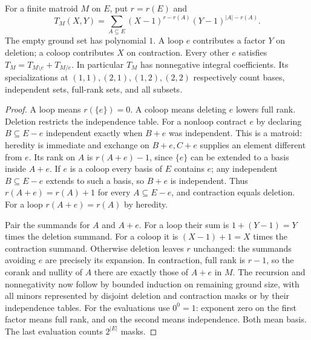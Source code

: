 \begin{theorem}\label{result52}
For a finite matroid $M$ on $E$, put $r=r(E)$ and
\[
 T_M(X,Y)=\sum_{A\subseteq E}(X-1)^{r-r(A)}(Y-1)^{|A|-r(A)}.
\]
The empty ground set has polynomial $1$. A loop $e$ contributes a factor $Y$ on deletion; a coloop contributes $X$ on contraction. Every other $e$ satisfies $T_M=T_{M\setminus e}+T_{M/e}$. In particular $T_M$ has nonnegative integral coefficients. Its specializations at $(1,1),(2,1),(1,2),(2,2)$ respectively count bases, independent sets, full-rank sets, and all subsets.
\end{theorem}
\begin{proof}
A loop means $r(\{e\})=0$. A coloop means deleting $e$ lowers full rank. Deletion restricts the independence table. For a nonloop contract $e$ by declaring $B\subseteq E-e$ independent exactly when $B+e$ was independent. This is a matroid: heredity is immediate and exchange on $B+e,C+e$ supplies an element different from $e$. Its rank on $A$ is $r(A+e)-1$, since $\{e\}$ can be extended to a basis inside $A+e$. If $e$ is a coloop every basis of $E$ contains $e$; any independent $B\subseteq E-e$ extends to such a basis, so $B+e$ is independent. Thus $r(A+e)=r(A)+1$ for every $A\subseteq E-e$, and contraction equals deletion. For a loop $r(A+e)=r(A)$ by heredity.

Pair the summands for $A$ and $A+e$. For a loop their sum is $1+(Y-1)=Y$ times the deletion summand. For a coloop it is $(X-1)+1=X$ times the contraction summand. Otherwise deletion leaves $r$ unchanged: the summands avoiding $e$ are precisely its expansion. In contraction, full rank is $r-1$, so the corank and nullity of $A$ there are exactly those of $A+e$ in $M$. The recursion and nonnegativity now follow by bounded induction on remaining ground size, with all minors represented by disjoint deletion and contraction masks or by their independence tables. For the evaluations use $0^0=1$: exponent zero on the first factor means full rank, and on the second means independence. Both mean basis. The last evaluation counts $2^{|E|}$ masks.
\end{proof}

